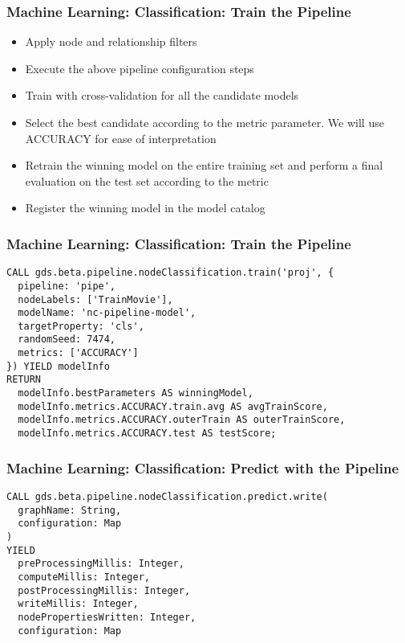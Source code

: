 \begin{frame}[fragile]\frametitle{Machine Learning: Classification: Train the Pipeline}

\begin{itemize}
\item Apply node and relationship filters
\item Execute the above pipeline configuration steps
\item Train with cross-validation for all the candidate models
\item Select the best candidate according to the metric parameter. We will use ACCURACY for ease of interpretation
\item Retrain the winning model on the entire training set and perform a final evaluation on the test set according to the metric
\item Register the winning model in the model catalog

\end{itemize}

\end{frame}


\begin{frame}[fragile]\frametitle{Machine Learning: Classification: Train the Pipeline}



\begin{lstlisting}
CALL gds.beta.pipeline.nodeClassification.train('proj', {
  pipeline: 'pipe',
  nodeLabels: ['TrainMovie'],
  modelName: 'nc-pipeline-model',
  targetProperty: 'cls',
  randomSeed: 7474,
  metrics: ['ACCURACY']
}) YIELD modelInfo
RETURN
  modelInfo.bestParameters AS winningModel,
  modelInfo.metrics.ACCURACY.train.avg AS avgTrainScore,
  modelInfo.metrics.ACCURACY.outerTrain AS outerTrainScore,
  modelInfo.metrics.ACCURACY.test AS testScore;
\end{lstlisting}
\end{frame}

\begin{frame}[fragile]\frametitle{Machine Learning: Classification: Predict with the Pipeline}

\begin{lstlisting}
CALL gds.beta.pipeline.nodeClassification.predict.write(
  graphName: String,
  configuration: Map
)
YIELD
  preProcessingMillis: Integer,
  computeMillis: Integer,
  postProcessingMillis: Integer,
  writeMillis: Integer,
  nodePropertiesWritten: Integer,
  configuration: Map
\end{lstlisting}
	
\end{frame}



